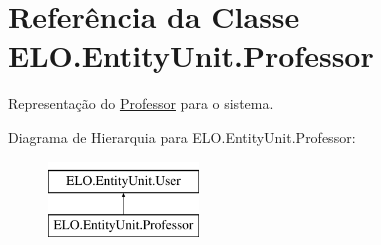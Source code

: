\hypertarget{classELO_1_1EntityUnit_1_1Professor}{\section{Referência da Classe E\-L\-O.\-Entity\-Unit.\-Professor}
\label{classELO_1_1EntityUnit_1_1Professor}
}


Representação do \hyperlink{classELO_1_1EntityUnit_1_1Professor}{Professor} para o sistema.  


Diagrama de Hierarquia para E\-L\-O.\-Entity\-Unit.\-Professor\-:\begin{figure}[H]
\begin{center}
\leavevmode
\includegraphics[height=2.000000cm]{d5/df1/classELO_1_1EntityUnit_1_1Professor}
\end{center}
\end{figure}
